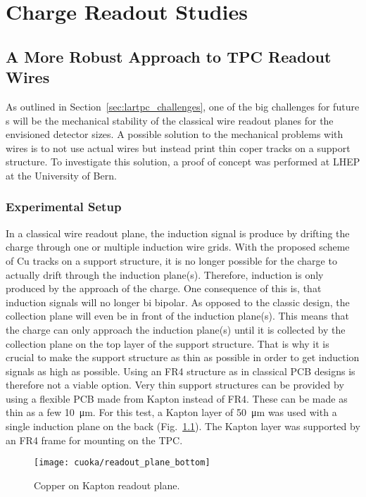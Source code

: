\chapter{Charge Readout Studies}
\label{chap:charge-ro}


\section{A More Robust Approach to TPC Readout Wires}
\label{sec:charge-ro_cuoka}

As outlined in Section~\ref{sec:lartpc_challenges}, one of the big challenges for future \lartpc s will be the mechanical stability of the classical wire readout planes for the envisioned detector sizes.
A possible solution to the mechanical problems with wires is to not use actual wires but instead print thin coper tracks on a support structure.
To investigate this solution, a proof of concept was performed at LHEP at the University of Bern.


\subsection*{Experimental Setup}

In a classical wire readout plane, the induction signal is produce by drifting the charge through one or multiple induction wire grids.
With the proposed scheme of \si{Cu} tracks on a support structure, it is no longer possible for the charge to actually drift through the induction plane(s).
Therefore, induction is only produced by the approach of the charge.
One consequence of this is, that induction signals will no longer bi bipolar.
As opposed to the classic design, the collection plane will even be in front of the induction plane(s).
This means that the charge can only approach the induction plane(s) until it is collected by the collection plane on the top layer of the support structure.
That is why it is crucial to make the support structure as thin as possible in order to get induction signals as high as possible.
Using an FR4 structure as in classical PCB designs is therefore not a viable option.
Very thin support structures can be provided by using a flexible PCB made from Kapton instead of FR4.
These can be made as thin as a few \SI{10}{\micro\metre}.
For this test, a Kapton layer of \SI{50}{\micro\metre} was used with a single induction plane on the back (Fig.~\ref{fig:cuoka_readout-plane}).
The Kapton layer was supported by an FR4 frame for mounting on the TPC.

\begin{figure}[htb]
	\centering
	\texttt{[image: cuoka/readout\_plane\_bottom]}
	\caption{Copper on Kapton readout plane.}
	\label{fig:cuoka_readout-plane}
\end{figure}

